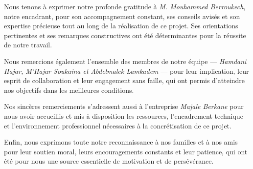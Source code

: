

Nous tenons à exprimer notre profonde gratitude à \textit{M. Mouhammed Berroukech}, notre encadrant, pour son accompagnement constant, ses conseils avisés et son expertise précieuse tout au long de la réalisation de ce projet. Ses orientations pertinentes et ses remarques constructives ont été déterminantes pour la réussite de notre travail.

Nous remercions également l’ensemble des membres de notre équipe — \textit{Hamdani Hajar, M’Hajar Soukaina et Abdelmalek Lamkadem} — pour leur implication, leur esprit de collaboration et leur engagement sans faille, qui ont permis d’atteindre nos objectifs dans les meilleures conditions.

Nos sincères remerciements s’adressent aussi à l’entreprise \textit{Majale Berkane} pour nous avoir accueillis et mis à disposition les ressources, l’encadrement technique et l’environnement professionnel nécessaires à la concrétisation de ce projet.

Enfin, nous exprimons toute notre reconnaissance à nos familles et à nos amis pour leur soutien moral, leurs encouragements constants et leur patience, qui ont été pour nous une source essentielle de motivation et de persévérance.

\MediaOptionLogicBlank